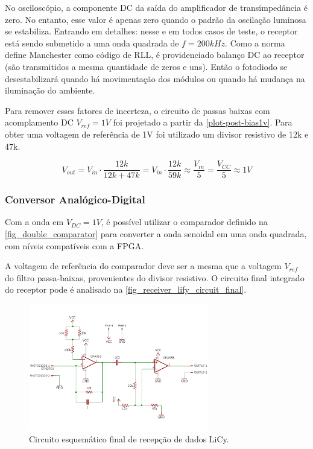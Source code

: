	No osciloscópio, a componente DC da saída do amplificador de transimpedância é zero. No entanto, esse valor é apenas zero quando o padrão da oscilação luminosa se estabiliza. Entrando em detalhes: nesse e em todos casos de teste, o receptor está sendo submetido a uma onda quadrada de $f = 200kHz$. Como a norma define Manchester como código de RLL, é providenciado balanço DC ao receptor (são transmitidos a mesma quantidade de zeros e uns). Então o fotodiodo se desestabilizará quando há movimentação dos módulos ou quando há mudança na iluminação do ambiente.
	
	Para remover esses fatores de incerteza, o circuito de passas baixas com acomplamento DC $V_{ref} = 1V$ foi projetado a partir da \autoref{plot-post-bias1v}. Para obter uma voltagem de referência de 1V foi utilizado um divisor resistivo de 12k e 47k. 
	
	\begin{equation}
	V_{out} = V_{in} \cdot \frac{12k}{12k + 47k} = V_{in} \cdot \frac{12k}{59k} \approx \frac{V_{in}}{5} = \frac{V_{CC}}{5} \approx 1V
	\end{equation}
	
	\subsubsection{Conversor Analógico-Digital}
	
	Com a onda em $V_{DC} = 1V$, é possível utilizar o comparador definido na \autoref{fig_double_comparator} para converter a onda senoidal em uma onda quadrada, com níveis compatíveis com a FPGA.
	
	A voltagem de referência do comparador deve ser a mesma que a voltagem $V_{ref}$ do filtro passa-baixas, provenientes do divisor resistivo. O circuito final integrado do receptor pode é analisado na \autoref{fig_receiver_lify_circuit_final}.

	\begin{figure}[htb]
		\caption{\label{fig_receiver_lify_circuit_final} Circuito esquemático final de recepção de dados LiCy.}
		\centering
		\includegraphics[width=0.7\textwidth, trim={0cm 1cm 0cm 1cm}, clip]{circuits/receiver_lify_final.pdf}
	\end{figure}
	
